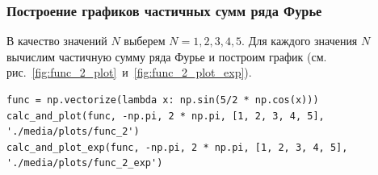 \subsubsection{Построение графиков частичных сумм ряда Фурье}
В качество значений $N$ выберем $N = 1, 2, 3, 4, 5$. Для каждого значения $N$ вычислим частичную сумму ряда Фурье и построим график (см. рис.~\ref{fig:func_2_plot}~и~\ref{fig:func_2_plot_exp}).

\begin{lstlisting}[style=python_white, caption=Построение графиков частичных сумм ряда Фурье, label=lst:func_1_plot]
func = np.vectorize(lambda x: np.sin(5/2 * np.cos(x)))
calc_and_plot(func, -np.pi, 2 * np.pi, [1, 2, 3, 4, 5], './media/plots/func_2')
calc_and_plot_exp(func, -np.pi, 2 * np.pi, [1, 2, 3, 4, 5], './media/plots/func_2_exp')
\end{lstlisting}

